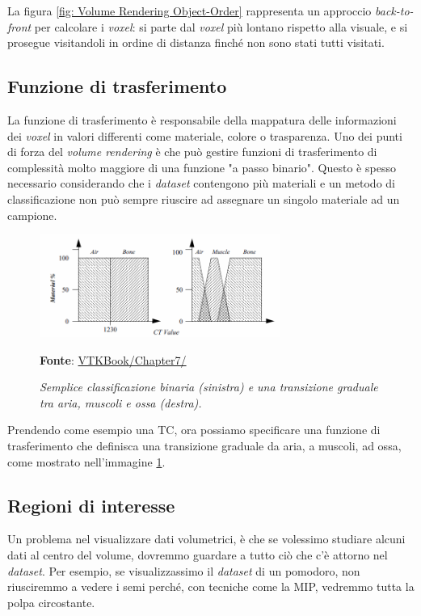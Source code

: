 La figura \ref{fig: Volume Rendering Object-Order} rappresenta un approccio \emph{back-to-front} per calcolare i \emph{voxel}: si parte dal \emph{voxel} più lontano rispetto alla visuale, e si prosegue visitandoli in ordine di distanza finché non sono stati tutti visitati.

\subsection{Funzione di trasferimento}\label{sec:funzione-trasferimento}
La funzione di trasferimento è responsabile della mappatura delle informazioni dei \emph{voxel} in valori differenti come materiale, colore o trasparenza. Uno dei punti di forza del \emph{volume rendering} è che può gestire funzioni di trasferimento di complessità molto maggiore di una funzione "a passo binario". Questo è spesso necessario considerando che i \emph{dataset} contengono più materiali e un metodo di classificazione non può sempre riuscire ad assegnare un singolo materiale ad un campione.

\begin{figure}[h]
    \centering
    \includegraphics[width=0.7\textwidth]{immagini/volumerendering/functions.png}
    \caption{\textit{Semplice classificazione binaria (sinistra) e una transizione graduale tra aria, muscoli e ossa (destra).}}
    \textbf{Fonte}: \href{https://lorensen.github.io/VTKExamples/site/VTKBook/07Chapter7/}{VTKBook/Chapter7/}
    \label{fig: Funzione di Trasferimento}
\end{figure}

Prendendo come esempio una TC, ora possiamo specificare una funzione di trasferimento che definisca una transizione graduale da aria, a muscoli, ad ossa, come mostrato nell'immagine \ref{fig: Funzione di Trasferimento}.

\subsection{Regioni di interesse}\label{sec:regioni-di-interesse}
Un problema nel visualizzare dati volumetrici, è che se volessimo studiare alcuni dati al centro del volume, dovremmo guardare a tutto ciò che c'è attorno nel \emph{dataset}. Per esempio, se visualizzassimo il \emph{dataset} di un pomodoro, non riusciremmo a vedere i semi perché, con tecniche come la MIP, vedremmo tutta la polpa circostante.

